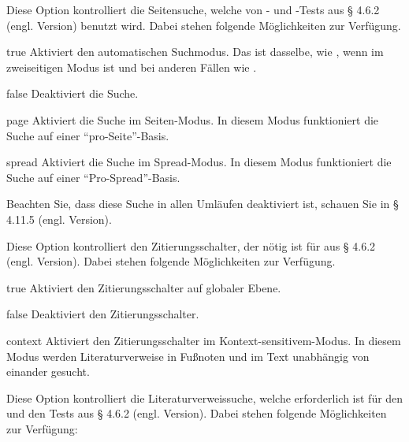 \documentclass{ltxdockit}[2011/03/25]
\begin{document}
\begin{optionlist}


Diese Option kontrolliert die Seitensuche, welche von - und
-Tests aus § 4.6.2 (engl. Version) %
benutzt wird. Dabei stehen folgende Möglichkeiten zur Verfügung.

\begin{valuelist} 
\item[true] Aktiviert den automatischen Suchmodus. Das ist
dasselbe, wie , wenn \latex im zweiseitigen Modus ist und bei
anderen Fällen wie .
\item[false] Deaktiviert die Suche.  
\item[page] Aktiviert die Suche im Seiten-Modus. In diesem Modus funktioniert die Suche auf
einer "`pro-Seite"'-Basis.	
\item[spread] Aktiviert die Suche im Spread-Modus. In diesem Modus funktioniert die Suche
auf einer "`Pro-Spread"'-Basis.	
\end{valuelist} 

Beachten Sie, dass diese Suche in allen Umläufen deaktiviert ist, schauen Sie in
§ 4.11.5 (engl. Version). %


Diese Option kontrolliert den Zitierungsschalter, der nötig ist für
 aus § 4.6.2 (engl. Version). %
Dabei stehen folgende Möglichkeiten zur Verfügung.

\begin{valuelist} 
\item[true] Aktiviert den Zitierungsschalter auf globaler
Ebene.  
\item[false] Deaktiviert den Zitierungsschalter. 
\item[context]
Aktiviert den Zitierungsschalter im Kontext-sensitivem-Modus.  In diesem Modus
werden Literaturverweise in Fußnoten und im Text unabhängig von einander
gesucht. 
\end{valuelist}


Diese Option kontrolliert die Literaturverweissuche, welche erforderlich ist
für den  und den  Tests aus
§ 4.6.2 (engl. Version). %
Dabei stehen folgende Möglichkeiten zur Verfügung:


\end{optionlist}
\end{document}
